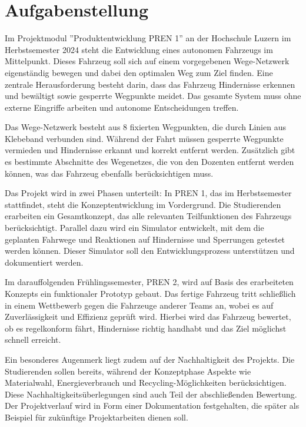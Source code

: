 \newpage
\section{Aufgabenstellung}
Im Projektmodul ''Produktentwicklung PREN 1'' an der Hochschule Luzern im Herbstsemester 2024 steht die Entwicklung eines autonomen Fahrzeugs im Mittelpunkt. Dieses Fahrzeug soll sich auf einem vorgegebenen Wege-Netzwerk eigenständig bewegen und dabei den optimalen Weg zum Ziel finden. Eine zentrale Herausforderung besteht darin, dass das Fahrzeug Hindernisse erkennen und bewältigt sowie gesperrte Wegpunkte meidet. Das gesamte System muss ohne externe Eingriffe arbeiten und autonome Entscheidungen treffen. 

Das Wege-Netzwerk besteht aus 8 fixierten Wegpunkten, die durch Linien aus Klebeband verbunden sind. Während der Fahrt müssen gesperrte Wegpunkte vermieden und Hindernisse erkannt und korrekt entfernt werden. Zusätzlich gibt es bestimmte Abschnitte des Wegenetzes, die von den Dozenten entfernt werden können, was das Fahrzeug ebenfalls berücksichtigen muss. 

Das Projekt wird in zwei Phasen unterteilt: In PREN 1, das im Herbstsemester stattfindet, steht die Konzeptentwicklung im Vordergrund. Die Studierenden erarbeiten ein Gesamtkonzept, das alle relevanten Teilfunktionen des Fahrzeugs berücksichtigt. Parallel dazu wird ein Simulator entwickelt, mit dem die geplanten Fahrwege und Reaktionen auf Hindernisse und Sperrungen getestet werden können. Dieser Simulator soll den Entwicklungsprozess unterstützen und dokumentiert werden. 

Im darauffolgenden Frühlingssemester, PREN 2, wird auf Basis des erarbeiteten Konzepts ein funktionaler Prototyp gebaut. Das fertige Fahrzeug tritt schließlich in einem Wettbewerb gegen die Fahrzeuge anderer Teams an, wobei es auf Zuverlässigkeit und Effizienz geprüft wird. Hierbei wird das Fahrzeug bewertet, ob es regelkonform fährt, Hindernisse richtig handhabt und das Ziel möglichst schnell erreicht. 

Ein besonderes Augenmerk liegt zudem auf der Nachhaltigkeit des Projekts. Die Studierenden sollen bereits, während der Konzeptphase Aspekte wie Materialwahl, Energieverbrauch und Recycling-Möglichkeiten berücksichtigen. Diese Nachhaltigkeitsüberlegungen sind auch Teil der abschließenden Bewertung. Der Projektverlauf wird in Form einer Dokumentation festgehalten, die später als Beispiel für zukünftige Projektarbeiten dienen soll.


